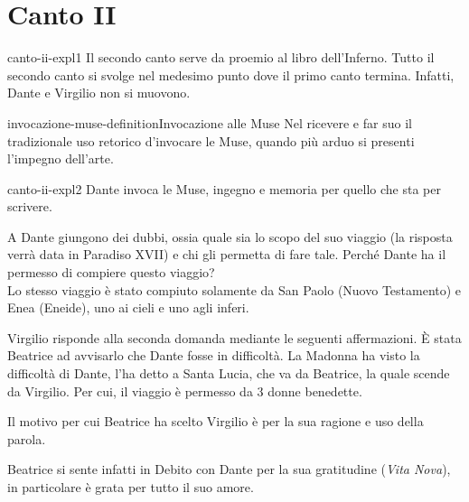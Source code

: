 \documentclass[preview]{standalone}
\begin{document}
\genpage

\section{Canto II}

\begin{snippet}{canto-ii-expl1}
    Il secondo canto serve da proemio al libro dell'Inferno.
    Tutto il secondo canto si svolge nel medesimo punto dove il primo canto termina.
    Infatti, Dante e Virgilio non si muovono.
\end{snippet}

\begin{snippetdefinition}{invocazione-muse-definition}{Invocazione alle Muse}
    Nel ricevere e far suo il tradizionale uso retorico d'invocare le Muse, quando più arduo si presenti l'impegno dell'arte.
\end{snippetdefinition}

\begin{snippet}{canto-ii-expl2}
    Dante invoca le Muse, ingegno e memoria per quello che sta per scrivere.

    A Dante giungono dei dubbi, ossia quale sia lo scopo del suo viaggio
    (la risposta verrà data in Paradiso XVII) e chi gli permetta di fare tale.
    Perché Dante ha il permesso di compiere questo viaggio?
    \\
    Lo stesso viaggio è stato compiuto solamente da San Paolo (Nuovo Testamento)
    e Enea (Eneide), uno ai cieli e uno agli inferi.
    
    Virgilio risponde alla seconda domanda mediante le seguenti affermazioni.
    È stata Beatrice ad avvisarlo che Dante fosse in difficoltà.
    La Madonna ha visto la difficoltà di Dante, l'ha detto a Santa Lucia, che va da Beatrice,
    la quale scende da Virgilio.
    Per cui, il viaggio è permesso da 3 donne benedette.
    \begin{center}
    \end{center}
    Il motivo per cui Beatrice ha scelto Virgilio è per la sua ragione e uso della parola.
    
    Beatrice si sente infatti in Debito con Dante per la sua gratitudine (\textit{Vita Nova}),
    in particolare è grata per tutto il suo amore.
\end{snippet}
\end{document}
